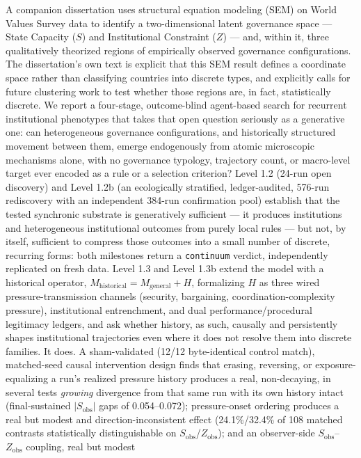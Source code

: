 A companion dissertation uses structural equation modeling (SEM) on World
Values Survey data to identify a two-dimensional latent governance space
--- State Capacity ($S$) and Institutional Constraint ($Z$) --- and, within
it, three qualitatively theorized regions of empirically observed
governance configurations. The dissertation's own text is explicit that
this SEM result defines a coordinate space rather than classifying
countries into discrete types, and explicitly calls for future clustering
work to test whether those regions are, in fact, statistically discrete.
We report a four-stage, outcome-blind agent-based search for recurrent
institutional phenotypes that takes that open question seriously as a
generative one: can heterogeneous governance configurations, and
historically structured movement between them, emerge endogenously from
atomic microscopic mechanisms alone, with no governance typology, trajectory
count, or macro-level target ever encoded as a rule or a selection
criterion? Level 1.2 (24-run open discovery) and Level 1.2b (an ecologically
stratified, ledger-audited, 576-run rediscovery with an independent
384-run confirmation pool) establish that the tested synchronic substrate
is generatively sufficient --- it produces institutions and heterogeneous
institutional outcomes from purely local rules --- but not, by itself,
sufficient to compress those outcomes into a small number of discrete,
recurring forms: both milestones return a \texttt{continuum} verdict,
independently replicated on fresh data. Level 1.3 and Level 1.3b extend the
model with a historical operator, $M_{\text{historical}} = M_{\text{general}}
+ H$, formalizing $H$ as three wired pressure-transmission channels
(security, bargaining, coordination-complexity pressure), institutional
entrenchment, and dual performance/procedural legitimacy ledgers, and ask
whether history, as such, causally and persistently shapes institutional
trajectories even where it does not resolve them into discrete families.
It does. A sham-validated (12/12 byte-identical control match), matched-seed
causal intervention design finds that erasing, reversing, or exposure-
equalizing a run's realized pressure history produces a real, non-decaying,
in several tests \textit{growing} divergence from that same run with its
own history intact (final-sustained $|S_{\text{obs}}|$ gaps of
0.054--0.072); pressure-onset ordering produces a real but modest and
direction-inconsistent effect (24.1\%/32.4\% of 108 matched contrasts
statistically distinguishable on $S_{\text{obs}}$/$Z_{\text{obs}}$); and an
observer-side $S_{\text{obs}}$--$Z_{\text{obs}}$ coupling, real but modest

